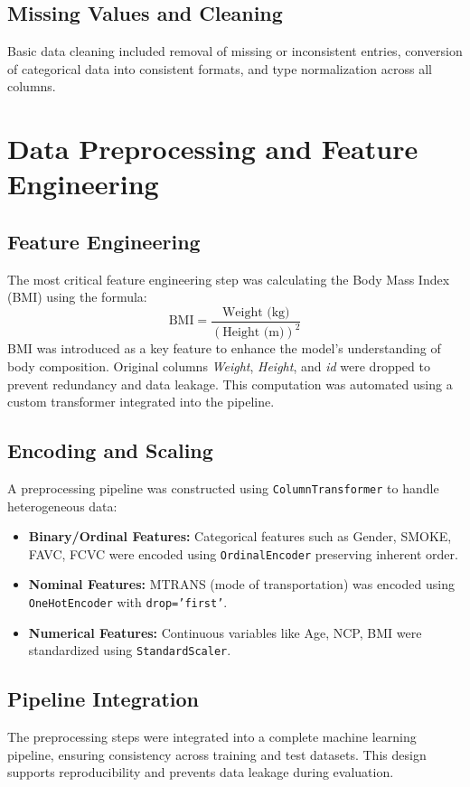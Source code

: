 \documentclass[12pt,a4paper]{report}
\begin{document}
\section{Missing Values and Cleaning}
Basic data cleaning included removal of missing or inconsistent entries, conversion of categorical data into consistent formats, and type normalization across all columns.

\chapter{Data Preprocessing and Feature Engineering}

\section{Feature Engineering}
The most critical feature engineering step was calculating the Body Mass Index (BMI) using the formula:
\[
    \text{BMI} = \frac{\text{Weight (kg)}}{(\text{Height (m)})^2}
\]
BMI was introduced as a key feature to enhance the model’s understanding of body composition. Original columns \textit{Weight}, \textit{Height}, and \textit{id} were dropped to prevent redundancy and data leakage. This computation was automated using a custom transformer integrated into the pipeline.

\section{Encoding and Scaling}
A preprocessing pipeline was constructed using \texttt{ColumnTransformer} to handle heterogeneous data:
\begin{itemize}
    \item \textbf{Binary/Ordinal Features:} Categorical features such as Gender, SMOKE, FAVC, FCVC were encoded using \texttt{OrdinalEncoder} preserving inherent order.
    \item \textbf{Nominal Features:} MTRANS (mode of transportation) was encoded using \texttt{OneHotEncoder} with \texttt{drop='first'}.
    \item \textbf{Numerical Features:} Continuous variables like Age, NCP, BMI were standardized using \texttt{StandardScaler}.
\end{itemize}

\section{Pipeline Integration}
The preprocessing steps were integrated into a complete machine learning pipeline, ensuring consistency across training and test datasets. This design supports reproducibility and prevents data leakage during evaluation.
\end{document}
